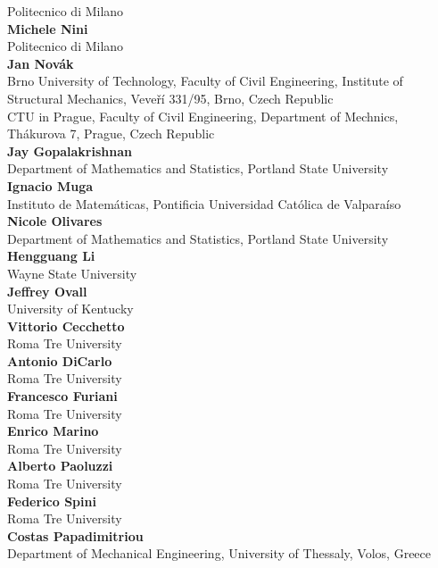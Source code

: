 \documentclass[article,A4,11pt]{llncs}%
\begin{document}
    Politecnico di Milano\\
        \noindent
    {\bf Michele Nini}\\
    Politecnico di Milano\\
        \noindent
    {\bf Jan Nov\'{a}k}\\
    Brno University of Technology, Faculty of Civil Engineering, Institute of Structural Mechanics, Veve\v{r}\'{i} 331/95, Brno, Czech Republic\\CTU in Prague, Faculty of Civil Engineering, Department of Mechnics, Th\'akurova 7, Prague, Czech Republic\\
        \noindent
    {\bf Jay Gopalakrishnan}\\
    Department of Mathematics and Statistics, Portland State University\\
        \noindent
    {\bf Ignacio Muga}\\
    Instituto de Matemáticas, Pontificia Universidad Católica de Valparaíso\\
        \noindent
    {\bf Nicole Olivares}\\
    Department of Mathematics and Statistics, Portland State University\\
        \noindent
    {\bf Hengguang Li}\\
    Wayne State University\\
        \noindent
    {\bf Jeffrey Ovall}\\
    University of Kentucky\\
        \noindent
    {\bf Vittorio Cecchetto}\\
    Roma Tre University\\
        \noindent
    {\bf Antonio DiCarlo}\\
    Roma Tre University\\
        \noindent
    {\bf Francesco Furiani}\\
    Roma Tre University\\
        \noindent
    {\bf Enrico Marino}\\
    Roma Tre University\\
        \noindent
    {\bf Alberto Paoluzzi}\\
    Roma Tre University\\
        \noindent
    {\bf Federico Spini}\\
    Roma Tre University\\
        \noindent
    {\bf Costas Papadimitriou}\\
    Department of Mechanical Engineering, University of Thessaly, Volos, Greece\\
\end{document}
